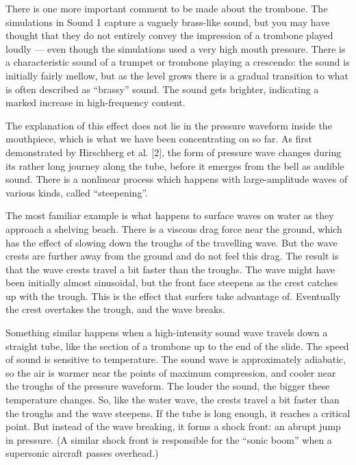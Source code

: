   There is one more important comment to be made about the trombone. The 
  simulations in Sound 1 capture a vaguely brass-like sound, but you may have 
  thought that they do not entirely convey the impression of a trombone played 
  loudly — even though the simulations used a very high mouth pressure. There 
  is a characteristic sound of a trumpet or trombone playing a crescendo: the 
  sound is initially fairly mellow, but as the level grows there is a gradual 
  transition to what is often described as “brassy” sound. The sound gets 
  brighter, indicating a marked increase in high-frequency content. 

  The explanation of this effect does not lie in the pressure waveform inside 
  the mouthpiece, which is what we have been concentrating on so far. As first 
  demonstrated by Hirschberg et al. [2], the form of pressure wave changes 
  during its rather long journey along the tube, before it emerges from the 
  bell as audible sound. There is a nonlinear process which happens with 
  large-amplitude waves of various kinds, called “steepening”. 

  The most familiar example is what happens to surface waves on water as they 
  approach a shelving beach. There is a viscous drag force near the ground, 
  which has the effect of slowing down the troughs of the travelling wave. But 
  the wave crests are further away from the ground and do not feel this drag. 
  The result is that the wave crests travel a bit faster than the troughs. The 
  wave might have been initially almost sinusoidal, but the front face steepens 
  as the crest catches up with the trough. This is the effect that surfers take 
  advantage of. Eventually the crest overtakes the trough, and the wave breaks. 

  Something similar happens when a high-intensity sound wave travels down a 
  straight tube, like the section of a trombone up to the end of the slide. The 
  speed of sound is sensitive to temperature. The sound wave is approximately 
  adiabatic, so the air is warmer near the points of maximum compression, and 
  cooler near the troughs of the pressure waveform. The louder the sound, the 
  bigger these temperature changes. So, like the water wave, the crests travel 
  a bit faster than the troughs and the wave steepens. If the tube is long 
  enough, it reaches a critical point. But instead of the wave breaking, it 
  forms a shock front: an abrupt jump in pressure. (A similar shock front is 
  responsible for the “sonic boom” when a supersonic aircraft passes overhead.) 


